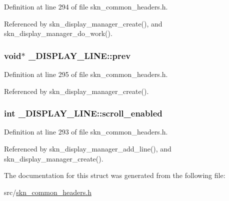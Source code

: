 Definition at line 294 of file skn\+\_\+common\+\_\+headers.\+h.



Referenced by skn\+\_\+display\+\_\+manager\+\_\+create(), and skn\+\_\+display\+\_\+manager\+\_\+do\+\_\+work().

\hypertarget{struct___d_i_s_p_l_a_y___l_i_n_e_aadc57636aadef3cff11443217e7f50e5}{
\subsubsection[{prev}]{\setlength{\rightskip}{0pt plus 5cm}void$\ast$ \+\_\+\+D\+I\+S\+P\+L\+A\+Y\+\_\+\+L\+I\+N\+E\+::prev}}\label{struct___d_i_s_p_l_a_y___l_i_n_e_aadc57636aadef3cff11443217e7f50e5}


Definition at line 295 of file skn\+\_\+common\+\_\+headers.\+h.



Referenced by skn\+\_\+display\+\_\+manager\+\_\+create().

\hypertarget{struct___d_i_s_p_l_a_y___l_i_n_e_ad92346a9708f3f3ba0c45dfb891c18e3}{
\subsubsection[{scroll\+\_\+enabled}]{\setlength{\rightskip}{0pt plus 5cm}int \+\_\+\+D\+I\+S\+P\+L\+A\+Y\+\_\+\+L\+I\+N\+E\+::scroll\+\_\+enabled}}\label{struct___d_i_s_p_l_a_y___l_i_n_e_ad92346a9708f3f3ba0c45dfb891c18e3}


Definition at line 293 of file skn\+\_\+common\+\_\+headers.\+h.



Referenced by skn\+\_\+display\+\_\+manager\+\_\+add\+\_\+line(), and skn\+\_\+display\+\_\+manager\+\_\+create().



The documentation for this struct was generated from the following file\+:\begin{DoxyCompactItemize}
\item 
src/\hyperlink{skn__common__headers_8h}{skn\+\_\+common\+\_\+headers.\+h}\end{DoxyCompactItemize}
